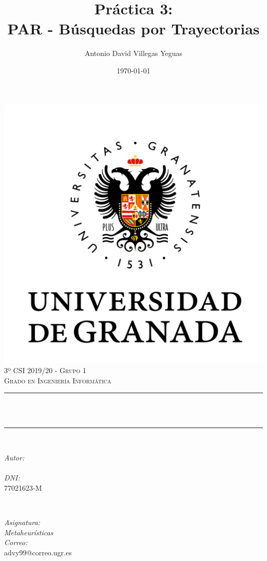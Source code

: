 \documentclass[12pt, spanish]{article}
\title{Práctica 3:\\
PAR - Búsquedas por Trayectorias  \hspace{0.05cm} }
\author{Antonio David Villegas Yeguas}
\date{\today}
\makeatletter
\let\thetitle\@title
\let\theauthor\@author
\makeatother
\begin{document}

\begin{titlepage}
    \centering
    \vspace*{0.3 cm}
    \includegraphics[scale = 0.50]{ugr.png}\\[0.7 cm]
    \textsc{\large 3º CSI 2019/20 - Grupo 1}\\[0.5 cm]            
    \textsc{\large Grado en Ingeniería Informática}\\[0.5 cm]              
    \rule{\linewidth}{0.2 mm} \\[0.2 cm]
    { \huge \bfseries \thetitle}\\
    \rule{\linewidth}{0.2 mm} \\[1 cm]
    
    \begin{minipage}{0.4\textwidth}
        \begin{flushleft} \large
            \emph{Autor:}\\
            \theauthor\\ 
			 \emph{DNI:}\\
            77021623-M
            \end{flushleft}
            \end{minipage}~
            \begin{minipage}{0.4\textwidth}
            \begin{flushright} \large
            \emph{Asignatura: \\
            Metaheurísticas}   \\     
            \emph{Correo:}\\
            advy99@correo.ugr.es           
        \end{flushright}
    \end{minipage}\\[0.5cm]
  

\end{titlepage}
\end{document}
